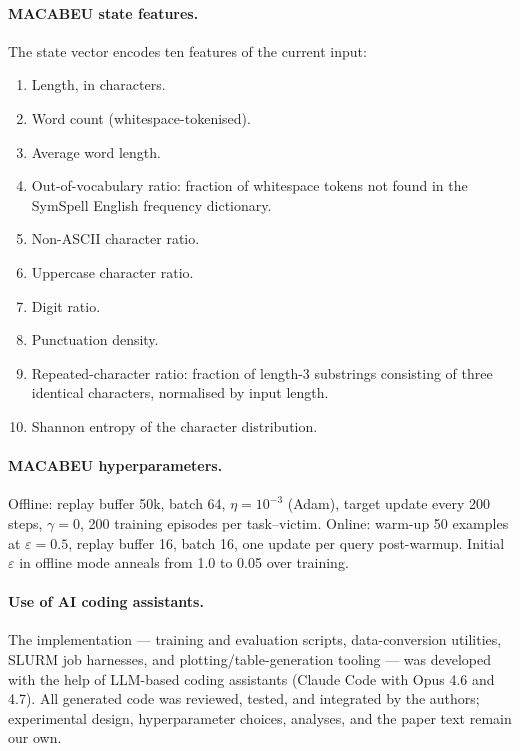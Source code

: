 \documentclass[11pt]{article}
\begin{document}
\paragraph{MACABEU state features.} The state vector encodes ten features of the current input:
\begin{enumerate}
    \item Length, in characters.
    \item Word count (whitespace-tokenised).
    \item Average word length.
    \item Out-of-vocabulary ratio: fraction of whitespace tokens not found in the SymSpell English frequency dictionary.
    \item Non-ASCII character ratio.
    \item Uppercase character ratio.
    \item Digit ratio.
    \item Punctuation density.
    \item Repeated-character ratio: fraction of length-3 substrings consisting of three identical characters, normalised by input length.
    \item Shannon entropy of the character distribution.
\end{enumerate}



\paragraph{MACABEU hyperparameters.} Offline: replay buffer 50k, batch 64, $\eta=10^{-3}$ (Adam), target update every 200 steps, $\gamma=0$, 200 training episodes per task--victim. Online: warm-up 50 examples at $\varepsilon=0.5$, replay buffer 16, batch 16, one update per query post-warmup. Initial $\varepsilon$ in offline mode anneals from 1.0 to 0.05 over training.


\paragraph{Use of AI coding assistants.} The implementation --- training and evaluation scripts, data-conversion utilities, SLURM job harnesses, and plotting/table-generation tooling --- was developed with the help of LLM-based coding assistants (Claude Code with Opus 4.6 and 4.7). All generated code was reviewed, tested, and integrated by the authors; experimental design, hyperparameter choices, analyses, and the paper text remain our own.
\end{document}
